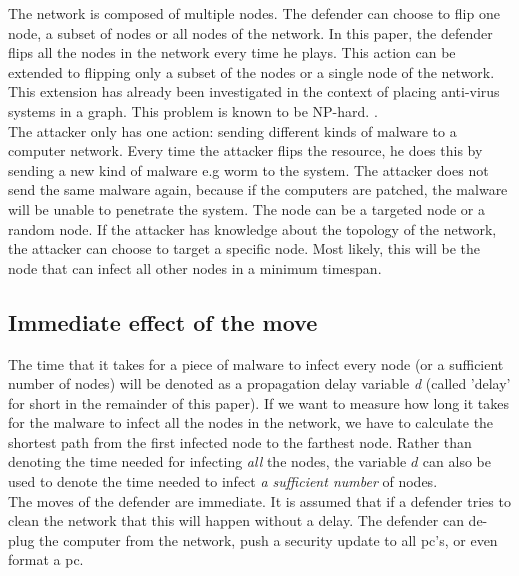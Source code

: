 The network is composed of multiple nodes. The defender can choose to flip one node, a subset of nodes or all nodes of the network. In this paper, the defender flips all the nodes in the network every time he plays. This action can be extended to flipping only a subset of the nodes or a single node of the network. This extension has already been investigated in the context of placing anti-virus systems in a graph. This problem is known to be NP-hard. \cite{NPhard}. \\ 
The attacker only has one action: sending different kinds of malware to a computer network. Every time the attacker flips the resource, he does this by sending a new kind of malware e.g worm to the system. The attacker does not send the same malware again, because if the computers are patched, the malware will be unable to penetrate the system. The node can be a targeted node or a random node. If the attacker has knowledge about the topology of the network, the attacker can choose to target a specific node. Most likely, this will be the node that can infect all other nodes in a minimum timespan.
\subsection{Immediate effect of the move}
The time that it takes for a piece of malware to infect every node (or a sufficient number of nodes) will be
denoted as a propagation delay variable \textit{d} (called 'delay' for short in the remainder of this paper). If we want to measure how long it takes for the malware to infect all the nodes in the network, we have to calculate the shortest path from the
first infected node to the farthest node. Rather than denoting the time needed for infecting \textit{all} the nodes, the variable $d$ can also be used to denote the time needed to infect \textit{a sufficient number} of nodes. \\
The moves of the defender are immediate. It is assumed that if a defender tries to clean the network that this will happen without a delay. The defender can de-plug the computer from the network, push a security update to all pc's, or even format a pc. 
